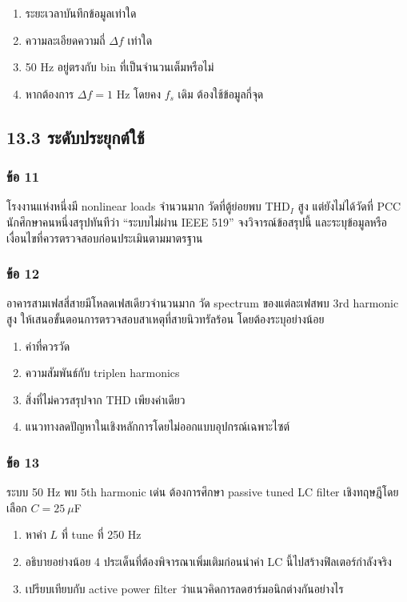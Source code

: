 \begin{enumerate}
    \item ระยะเวลาบันทึกข้อมูลเท่าใด
    \item ความละเอียดความถี่ $\Delta f$ เท่าใด
    \item 50 Hz อยู่ตรงกับ bin ที่เป็นจำนวนเต็มหรือไม่
    \item หากต้องการ $\Delta f=1$ Hz โดยคง $f_s$ เดิม ต้องใช้ข้อมูลกี่จุด
\end{enumerate}



\subsection{13.3 ระดับประยุกต์ใช้}

\subsubsection{ข้อ 11}

โรงงานแห่งหนึ่งมี nonlinear loads จำนวนมาก วัดที่ตู้ย่อยพบ THD$_I$ สูง แต่ยังไม่ได้วัดที่ PCC นักศึกษาคนหนึ่งสรุปทันทีว่า “ระบบไม่ผ่าน IEEE 519” จงวิจารณ์ข้อสรุปนี้ และระบุข้อมูลหรือเงื่อนไขที่ควรตรวจสอบก่อนประเมินตามมาตรฐาน

\subsubsection{ข้อ 12}

อาคารสามเฟสสี่สายมีโหลดเฟสเดียวจำนวนมาก วัด spectrum ของแต่ละเฟสพบ 3rd harmonic สูง ให้เสนอขั้นตอนการตรวจสอบสาเหตุที่สายนิวทรัลร้อน โดยต้องระบุอย่างน้อย

\begin{enumerate}
    \item ค่าที่ควรวัด
    \item ความสัมพันธ์กับ triplen harmonics
    \item สิ่งที่ไม่ควรสรุปจาก THD เพียงค่าเดียว
    \item แนวทางลดปัญหาในเชิงหลักการโดยไม่ออกแบบอุปกรณ์เฉพาะไซต์
\end{enumerate}

\subsubsection{ข้อ 13}

ระบบ 50 Hz พบ 5th harmonic เด่น ต้องการศึกษา passive tuned LC filter เชิงทฤษฎีโดยเลือก $C=25\ \mu$F

\begin{enumerate}
    \item หาค่า $L$ ที่ tune ที่ 250 Hz
    \item อธิบายอย่างน้อย 4 ประเด็นที่ต้องพิจารณาเพิ่มเติมก่อนนำค่า LC นี้ไปสร้างฟิลเตอร์กำลังจริง
    \item เปรียบเทียบกับ active power filter ว่าแนวคิดการลดฮาร์มอนิกต่างกันอย่างไร
\end{enumerate}

